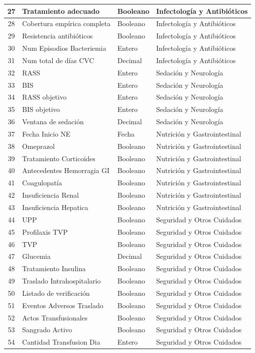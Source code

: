 \begin{longtable}{|c|l|l|l|}
27 & Tratamiento adecuado & Booleano & Infectología y Antibióticos \\ \hline
28 & Cobertura empírica completa & Booleano & Infectología y Antibióticos \\ \hline
29 & Resistencia antibióticos & Booleano & Infectología y Antibióticos \\ \hline
30 & Num Episodios Bacteriemia & Entero & Infectología y Antibióticos \\ \hline
31 & Num total de días CVC & Decimal & Infectología y Antibióticos \\ \hline
32 & RASS & Entero & Sedación y Neurología \\ \hline
33 & BIS & Entero & Sedación y Neurología \\ \hline
34 & RASS objetivo & Entero & Sedación y Neurología \\ \hline
35 & BIS objetivo & Entero & Sedación y Neurología \\ \hline
36 & Ventana de sedación & Decimal & Sedación y Neurología \\ \hline
37 & Fecha Inicio NE & Fecha & Nutrición y Gastrointestinal \\ \hline
38 & Omeprazol & Booleano & Nutrición y Gastrointestinal \\ \hline
39 & Tratamiento Corticoides & Booleano & Nutrición y Gastrointestinal \\ \hline
40 & Antecedentes Hemorragia GI & Booleano & Nutrición y Gastrointestinal \\ \hline
41 & Coagulopatía & Booleano & Nutrición y Gastrointestinal \\ \hline
42 & Insuficiencia Renal & Booleano & Nutrición y Gastrointestinal \\ \hline
43 & Insuficiencia Hepatica & Booleano & Nutrición y Gastrointestinal \\ \hline
44 & UPP & Booleano & Seguridad y Otros Cuidados \\ \hline
45 & Profilaxis TVP & Booleano & Seguridad y Otros Cuidados \\ \hline
46 & TVP & Booleano & Seguridad y Otros Cuidados \\ \hline
47 & Glucemia & Decimal & Seguridad y Otros Cuidados \\ \hline
48 & Tratamiento Insulina & Booleano & Seguridad y Otros Cuidados \\ \hline
49 & Traslado Intrahospitalario & Booleano & Seguridad y Otros Cuidados \\ \hline
50 & Listado de verificación & Booleano & Seguridad y Otros Cuidados \\ \hline
51 & Eventos Adversos Traslado & Booleano & Seguridad y Otros Cuidados \\ \hline
52 & Actos Transfusionales & Booleano & Seguridad y Otros Cuidados \\ \hline
53 & Sangrado Activo & Booleano & Seguridad y Otros Cuidados \\ \hline
54 & Cantidad Transfusion Dia & Entero & Seguridad y Otros Cuidados \\ \hline

\end{longtable}